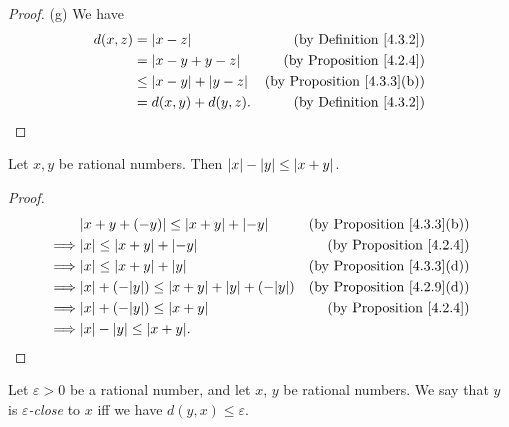 \begin{proof}{(g)}
    We have
    \begin{align*}
        d(x, z) & = \left\lvert x - z\right\rvert                  & \text{(by Definition \ref{4.3.2})}     \\
                & = \left\lvert x - y + y - z\right\rvert          & \text{(by Proposition \ref{4.2.4})}    \\
                & \leq \left\lvert x - y\right\rvert + \left\lvert y - z\right\rvert & \text{(by Proposition \ref{4.3.3}(b))} \\
                & = d(x, y) + d(y, z).           & \text{(by Definition \ref{4.3.2})}     \\
    \end{align*}
\end{proof}

\begin{additional corollary}\label{ac 4.3.1}
Let \(x, y\) be rational numbers.
Then \(\left\lvert x\right\rvert - \left\lvert y\right\rvert \leq \left\lvert x + y\right\rvert\).
\end{additional corollary}

\begin{proof}
    \begin{align*}
                 & \abs{x + y + (-y)} \leq \abs{x + y} + \abs{-y}               & \text{(by Proposition \ref{4.3.3}(b))} \\
        \implies & \abs{x} \leq \abs{x + y} + \abs{-y}                          & \text{(by Proposition \ref{4.2.4})}    \\
        \implies & \abs{x} \leq \abs{x + y} + \abs{y}                           & \text{(by Proposition \ref{4.3.3}(d))} \\
        \implies & \abs{x} + (-\abs{y}) \leq \abs{x + y} + \abs{y} + (-\abs{y}) & \text{(by Proposition \ref{4.2.9}(d))} \\
        \implies & \abs{x} + (-\abs{y}) \leq \abs{x + y}                        & \text{(by Proposition \ref{4.2.4})}    \\
        \implies & \abs{x} - \abs{y} \leq \abs{x + y}.
    \end{align*}
\end{proof}

\begin{definition}\label{4.3.4}
    Let \(\varepsilon > 0\) be a rational number, and let \(x\), \(y\) be rational numbers.
    We say that \(y\) is \emph{\(\varepsilon\)-close} to \(x\) iff we have \(d(y, x) \leq \varepsilon\).
\end{definition}

